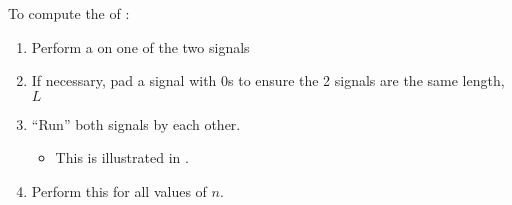 To compute the  of :
\begin{enumerate}[noitemsep]
\item Perform a  on one of the two signals
\item If necessary, pad a signal with 0s to ensure the 2 signals are the same length, $L$
\item ``Run'' both signals by each other.
  \begin{itemize}[noitemsep]
  \item This is illustrated in .
  \end{itemize}
\item Perform this for all values of $n$.
\end{enumerate}

